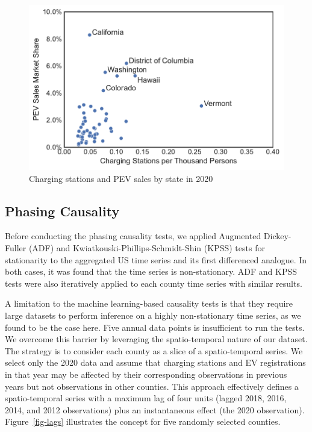 \documentclass[
  letterpaper,
  DIV=11,
  numbers=noendperiod]{scrartcl}
\begin{document}
\begin{figure}

{\centering \includegraphics{TRB_2023_files/figure-pdf/fig-state-compare-output-1.pdf}

}

\caption{\label{fig-state-compare}Charging stations and PEV sales by
state in 2020}

\end{figure}

\hypertarget{phasing-causality}{%
\subsection{Phasing Causality}\label{phasing-causality}}

Before conducting the phasing causality tests, we applied Augmented
Dickey-Fuller (ADF) and Kwiatkouski-Phillips-Schmidt-Shin (KPSS) tests
for stationarity to the aggregated US time series and its first
differenced analogue. In both cases, it was found that the time series
is non-stationary. ADF and KPSS tests were also iteratively applied to
each county time series with similar results.

A limitation to the machine learning-based causality tests is that they
require large datasets to perform inference on a highly non-stationary
time series, as we found to be the case here. Five annual data points is
insufficient to run the tests. We overcome this barrier by leveraging
the spatio-temporal nature of our dataset. The strategy is to consider
each county as a slice of a spatio-temporal series. We select only the
2020 data and assume that charging stations and EV registrations in that
year may be affected by their corresponding observations in previous
years but not observations in other counties. This approach effectively
defines a spatio-temporal series with a maximum lag of four units
(lagged 2018, 2016, 2014, and 2012 observations) plus an instantaneous
effect (the 2020 observation). Figure~\ref{fig-lags} illustrates the
concept for five randomly selected counties.
\end{document}
